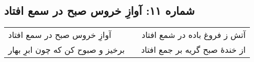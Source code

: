 \begin{center}
\section*{شماره ۱۱: آوازِ خروس صبح در سمع افتاد}
\label{sec:011}
\begin{longtable}{l p{0.5cm} r}
آوازِ خروس صبح در سمع افتاد
&&
آتش ز فروغ باده در شمع افتاد
\\
برخیز و صبوح کن که چون ابرِ بهار
&&
از خندهٔ صبح گریه بر جمع افتاد
\\
\end{longtable}
\end{center}
